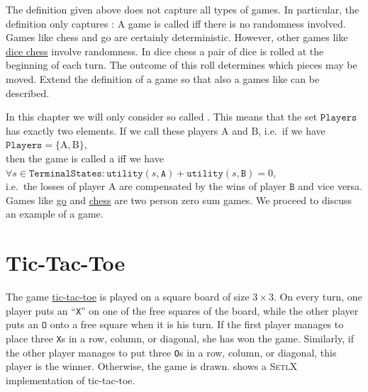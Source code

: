 \exercise
The definition given above does not capture all types of games.  In particular, the definition only captures 
:  A game is called  iff there is no randomness
involved.  Games like chess and go are certainly deterministic.  However, other games like 
\href{https://en.wikipedia.org/wiki/Dice_chess}{dice chess} involve randomness.  In dice chess a pair of dice is
rolled at the beginning of each turn.  The outcome of this roll determines which pieces may be moved.
Extend the definition of a
game so that also a games like  can be described. 
\eox

In this chapter we will only consider so called .  This means that the set $\texttt{Players}$
has exactly two elements.  If we call these players $\mathrm{A}$ and $\mathrm{B}$, i.e.~if we have
\\[0.2cm]
\hspace*{1.3cm}
$\texttt{Players} = \{ \mathrm{A}, \mathrm{B} \}$,
\\[0.2cm]
then the game is called a  iff we have
\\[0.2cm]
\hspace*{1.3cm}
$\forall s \in \texttt{TerminalStates}:\texttt{utility}(s, \texttt{A}) + \texttt{utility}(s, \texttt{B}) = 0$,
\\[0.2cm]
i.e.~the losses of player $\mathrm{A}$ are compensated by the wins of player $\texttt{B}$ and vice versa.
Games like \href{https://en.wikipedia.org/wiki/Go_(game)}{go} and 
\href{https://en.wikipedia.org/wiki/Chess}{chess} are two person zero sum games.
We proceed to discuss an example of a game.

\section{Tic-Tac-Toe}
The game \href{https://en.wikipedia.org/wiki/Tic-tac-toe}{tic-tac-toe} is played on a square board of size 
$3 \times 3$.  On every turn, one player puts an ``\texttt{X}'' on one of the free squares of the board, while
the other player puts an $\texttt{O}$ onto a free square when it is his turn.  If the first player manages
to place three \texttt{X}s in a 
row, column, or diagonal, she has won the game.  Similarly, if the other player manages to put three \texttt{O}s in a
row, column, or diagonal, this player is the winner.  Otherwise, the game is drawn.
 shows a \textsc{SetlX} implementation of tic-tac-toe.


